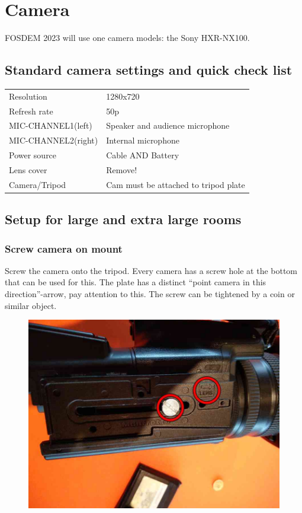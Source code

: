 \documentclass{article}
\begin{document}
\section{Camera}
FOSDEM 2023 will use one camera models: the Sony HXR-NX100.

\subsection{Standard camera settings and quick check list}
\begin{tabular}{| l | l |}
Resolution & 1280x720 \\
Refresh rate & 50p \\
MIC-CHANNEL1(left) &  Speaker and audience microphone \\
MIC-CHANNEL2(right) & Internal microphone \\
Power source & Cable AND Battery \\
Lens cover & Remove! \\
Camera/Tripod & Cam must be attached to tripod plate \\
\end{tabular}

\subsection{Setup for large and extra large rooms}

\subsubsection{Screw camera on mount}
Screw the camera onto the tripod. Every camera has a screw hole at the bottom that can be used for this. The plate has a distinct ``point camera in this direction''-arrow, pay attention to this. The screw can be tightened by a coin or similar object.

\begin{figure}[H]
  \centering
  \includegraphics[width = 120mm]{Cam00.jpg}
\end{figure}
\end{document}
